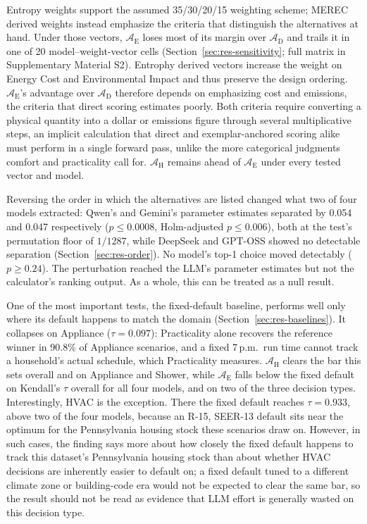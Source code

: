 \documentclass[final,3p,times]{elsarticle}
\begin{document}
Entropy weights support the assumed 35/30/20/15 weighting scheme; MEREC derived weights instead emphasize the criteria that distinguish the alternatives at hand. Under those vectors, $\mathcal{A}_{\text{E}}$ loses most of its margin over $\mathcal{A}_{\text{D}}$ and trails it in one of 20 model--weight-vector cells (Section~\ref{sec:res-sensitivity}; full matrix in Supplementary Material S2). Entrophy derived vectors increase the weight on Energy Cost and Environmental Impact and thus preserve the design ordering. $\mathcal{A}_{\text{E}}$'s advantage over $\mathcal{A}_{\text{D}}$ therefore depends on emphasizing cost and emissions, the criteria that direct scoring estimates poorly. Both criteria require converting a physical quantity into a dollar or emissions figure through several multiplicative steps, an implicit calculation that direct and exemplar-anchored scoring alike must perform in a single forward pass, unlike the more categorical judgments comfort and practicality call for. $\mathcal{A}_{\text{H}}$ remains ahead of $\mathcal{A}_{\text{E}}$ under every tested vector and model.

Reversing the order in which the alternatives are listed changed what two of four models extracted: Qwen's and Gemini's parameter estimates separated by 0.054 and 0.047 respectively ($p \le 0.0008$, Holm-adjusted $p \le 0.006$), both at the test's permutation floor of $1/1287$, while DeepSeek and GPT-OSS showed no detectable separation (Section~\ref{sec:res-order}). No model's top-1 choice moved detectably ($p \ge 0.24$). The perturbation reached the LLM's parameter estimates but not the calculator's ranking output. As a whole, this can be treated as a null result.

One of the most important tests, the fixed-default baseline, performs well only where its default happens to match the domain (Section~\ref{sec:res-baselines}). It collapses on Appliance ($\tau = 0.097$): Practicality alone recovers the reference winner in 90.8\% of Appliance scenarios, and a fixed 7\,p.m.\ run time cannot track a household's actual schedule, which Practicality measures. $\mathcal{A}_{\text{H}}$ clears the bar this sets overall and on Appliance and Shower, while $\mathcal{A}_{\text{E}}$ falls below the fixed default on Kendall's $\tau$ overall for all four models, and on two of the three decision types. Interestingly, HVAC is the exception. There the fixed default reaches $\tau = 0.933$, above two of the four models, because an R-15, SEER-13 default sits near the optimum for the Pennsylvania housing stock these scenarios draw on. However, in such cases, the finding says more about how closely the fixed default happens to track this dataset's Pennsylvania housing stock than about whether HVAC decisions are inherently easier to default on; a fixed default tuned to a different climate zone or building-code era would not be expected to clear the same bar, so the result should not be read as evidence that LLM effort is generally wasted on this decision type.
\end{document}
